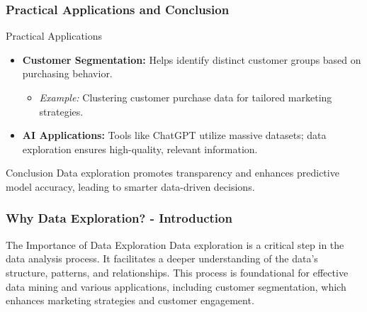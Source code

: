 \documentclass[aspectratio=169]{beamer}
\begin{document}
\begin{frame}[fragile]
    \frametitle{Practical Applications and Conclusion}
    \begin{block}{Practical Applications}
        \begin{itemize}
            \item \textbf{Customer Segmentation:} Helps identify distinct customer groups based on purchasing behavior.
                \begin{itemize}
                    \item \textit{Example:} Clustering customer purchase data for tailored marketing strategies.
                \end{itemize}
            \item \textbf{AI Applications:} Tools like ChatGPT utilize massive datasets; data exploration ensures high-quality, relevant information.
        \end{itemize}
    \end{block}
    \begin{block}{Conclusion}
        Data exploration promotes transparency and enhances predictive model accuracy, leading to smarter data-driven decisions.
    \end{block}
\end{frame}

\begin{frame}[fragile]
    \frametitle{Why Data Exploration? - Introduction}
    \begin{block}{The Importance of Data Exploration}
        Data exploration is a critical step in the data analysis process. It facilitates a deeper understanding of the data's structure, patterns, and relationships. This process is foundational for effective data mining and various applications, including customer segmentation, which enhances marketing strategies and customer engagement.
    \end{block}
\end{frame}
\end{document}
